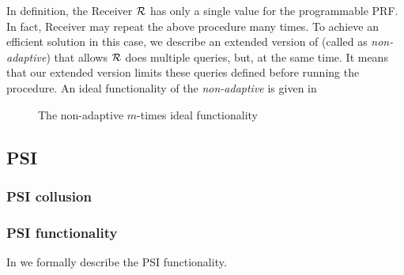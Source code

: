 
In  definition, the Receiver $\mathcal{R}$ has only a single value for the programmable PRF. In fact, Receiver may repeat the above procedure many times. To achieve an efficient solution in this case, we describe an extended version of \OPPRF (called as \textit{non-adaptive}) that allows $\mathcal{R}$ does multiple queries, but, at the same time. It means that our extended version limits these queries defined before running the procedure. An ideal functionality of the \textit{non-adaptive} \OPPRF is given in 

\begin{figure}[htb]\centering
\caption{The non-adaptive $m$-times \OPPRF ideal functionality}
\label{fig:nssotfunc}
\end{figure} 



\subsection{PSI }
\subsubsection{PSI collusion}
\subsubsection{PSI functionality}
\label{sec:psifunc}
In  we formally describe the PSI functionality.%

